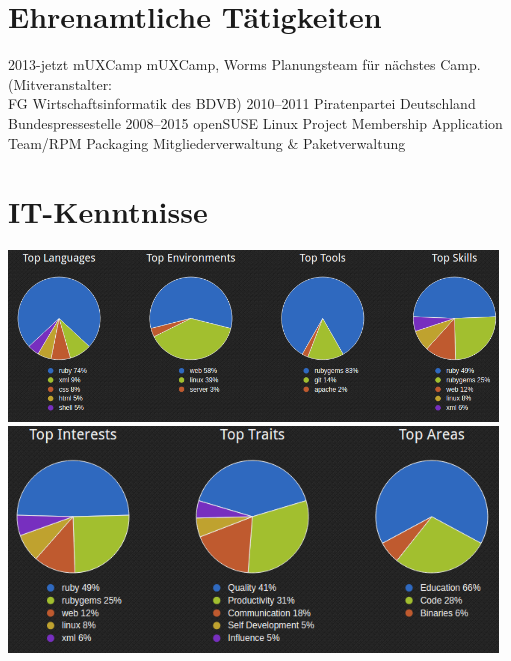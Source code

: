 \documentclass[a4paper,latin]{friggeri-cv} %
\begin{document}
\section{Ehrenamtliche Tätigkeiten}
\begin{entrylist}
\entry
{2013-jetzt}
{mUXCamp}
{mUXCamp, Worms}
{Planungsteam für nächstes Camp. (Mitveranstalter: \\FG Wirtschaftsinformatik des BDVB)}
\entry
{2010--2011}
{Piratenpartei Deutschland}
{Bundespressestelle}
{}
\entry
{2008--2015}
{openSUSE Linux Project}
{Membership Application Team/RPM Packaging}
{Mitgliederverwaltung \& Paketverwaltung}
\end{entrylist}

\newpage

\section{IT-Kenntnisse}

\includegraphics[width=13cm]{../Pictures/Skills1.png} \linebreak
\includegraphics[width=13cm]{../Pictures/Skills2.png}
\end{document}
